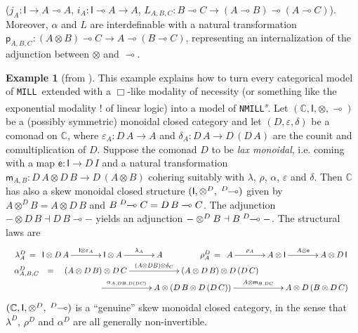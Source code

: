 \documentclass[submission,copyright,creativecommons]{eptcs}
\theoremstyle{definition}
\newtheorem{example}{Example}[section]
\newcommand{\ot}{\otimes}
\newcommand{\lolli}{\multimap}
\newcommand{\I}{\mathsf{I}}
\newcommand{\otd}{\ot^D}
\newcommand{\lollid}{\;\textsuperscript{$D$}\!\!\lolli}
\newcommand{\MILL}{\texttt{MILL}}
\newcommand{\NMILL}{\texttt{NMILL}}
\newcommand{\SkNMILL}{\NMILL\textsuperscript{\textit{s}}}
\begin{document}
($j_A : \I \to A \lolli A$, $i_A : \I \lolli A \to A$, $L_{A,B,C} : B \lolli C \to (A \lolli B) \lolli (A \lolli C)$).
Moreover, $\alpha$ and $L$ are interdefinable with a natural transformation $\mathsf{p}_{A , B , C} : (A \ot B) \lolli C \to A \lolli (B \lolli C)$, representing an internalization of the adjunction between $\ot$ and $\lolli$.
\begin{example}[from \cite{uustalu:eilenberg-kelly:2020}]
This example explains how to turn every categorical model of \MILL\ extended with a $\Box$-like modality of necessity (or something like the exponential modality $!$ of linear logic) into a model of \SkNMILL. 
Let $(\mathbb{C},\I,\ot,\lolli)$ be a (possibly symmetric) monoidal closed category and let $(D,\varepsilon, \delta)$ be a comonad on $\mathbb{C}$, where $\varepsilon_A : D\,A \to A$ and $\delta_A : D\,A \to D\,(D\,A)$ are the counit and comultiplication of $D$. Suppose the comonad $D$ to be \emph{lax monoidal}, i.e. coming with a map $\mathsf{e} : \I \to D\,I$ and a natural transformation $\mathsf{m}_{A,B} : D \,A \ot D\,B \to D\,(A \ot B)$ cohering suitably with $\lambda$, $\rho$, $\alpha$, $\varepsilon$ and $\delta$.
Then $\mathbb{C}$ has also a skew monoidal closed structure $(\I, \otd, \lollid)$ given by  $A \otd B = A \ot D\,B$ and $B \lollid C = D\,B \lolli C$. The adjunction $- \ot D\,B \dashv D\,B \lolli -$ yields an adjunction $- \otd B \dashv B \lollid -$. The structural laws are
\[
\begin{array}{c}
\lambda^D_A \, = \, \xymatrix@C=3pc{\I \ot D\,A \ar[r]^-{\I \ot \varepsilon_A} & \I \ot A \ar[r]^-{\lambda_A} & A} 
\hspace*{1.5cm}
\rho^D_A \, = \, \xymatrix@C=3pc{A \ar[r]^-{\rho_A} & A \ot \I \ar[r]^-{A \ot \mathsf{e}} & A \ot D\,\I} 
\\
\begin{array}{rcl}
\alpha^D_{A,B,C} & = & \xymatrix@C=5pc{(A \ot D\,B) \ot D\,C 
                   \ar[r]^-{(A \ot D B) \ot \delta_C}
                   & (A \ot D\,B) \ot D\,(D\,C)} \\
& & \hspace*{1.5cm} \xymatrix@C=5pc{\ar[r]^-{\alpha_{A,DB,D(DC)}}
                  & A \ot (D\,B \ot D\,(D\,C)) \ar[r]^-{A \ot \mathsf{m}_{B,DC}}
                  & A \ot D\,(B \ot D\,C)}
\end{array}
\end{array}
\]
$(\mathbb{C},\I,\otd,\lollid)$  is a ``genuine'' skew monoidal closed category, in the sense that $\lambda^D$, $\rho^D$ and $\alpha^D$ are all generally non-invertible.
\end{example}
\end{document}
